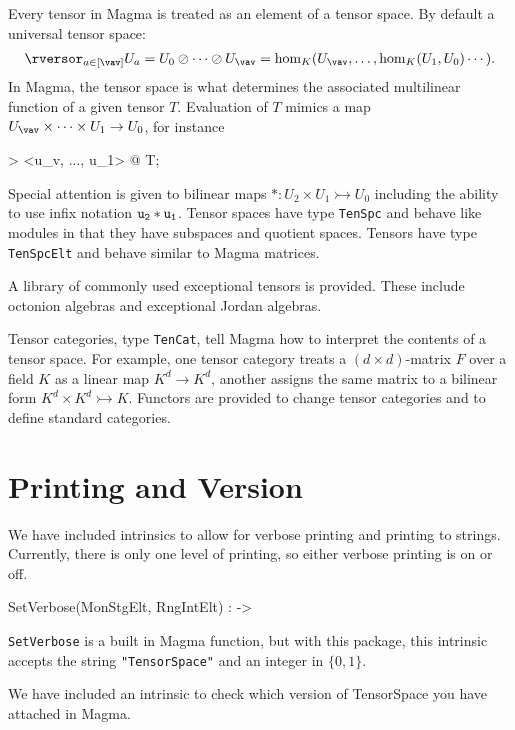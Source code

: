 \documentclass{documentation}
\begin{document}
Every tensor in Magma is treated as an element
of a tensor space. By default a universal tensor space:
\begin{align*}
   \rversor_{a\in[\vav]} U_a = U_0\oslash \cdots\oslash U_{\vav}
   = \hom_K(U_{\vav},\dots,\hom_K(U_1,U_0)\cdots).
\end{align*} 
In Magma, the tensor space is what determines the associated
multilinear function of a given tensor $T$.  
Evaluation of $T$ mimics a map
$U_{\vav}\times \cdots \times U_1\to U_0$, for instance
\begin{code}
> <u_v, ..., u_1> @ T;
\end{code}
Special attention is given to bilinear maps 
$*:U_2\times U_1\rightarrowtail U_0$
including the ability to use infix notation ${\tt u_2*u_1}$.
Tensor spaces have type {\tt TenSpc} and behave like modules 
in that they have subspaces and quotient spaces.  Tensors have type 
{\tt TenSpcElt} and behave similar to Magma matrices.


A library of commonly used exceptional tensors is provided.
These include octonion algebras and exceptional Jordan algebras.
 
Tensor categories, type {\tt TenCat}, tell Magma how to interpret the
contents of a tensor space.  For example, one tensor category treats a 
$(d\times d)$-matrix $F$ over a field $K$ as a linear map $K^d\to K^d$,
another assigns the same matrix to a bilinear form 
$K^d\times K^d\rightarrowtail K$.  Functors are provided to change
tensor categories and to define standard categories.  

\section{Printing and Version}

We have included intrinsics to allow for verbose printing and printing to strings. 
Currently, there is only one level of printing, so either verbose printing is on or off. 

\begin{intrinsics}
SetVerbose(MonStgElt, RngIntElt) : -> 
\end{intrinsics}

{\tt SetVerbose} is a built in Magma function, but with this package, this
intrinsic accepts the string \texttt{"TensorSpace"} and an integer in $\{0,1\}$.


We have included an intrinsic to check which version of TensorSpace you have attached in Magma.
\end{document}
